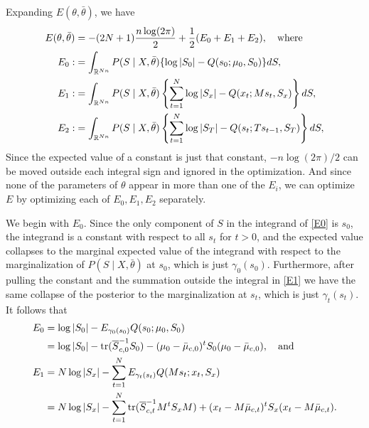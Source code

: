\documentclass[12pt,leqno]{article}
\begin{document}
Expanding $E(\theta,\bar{\theta})$, we have 
\begin{align}
  E(\theta,\bar{\theta}) &= -(2N+1)\frac{n\log(2\pi)}{2} + \frac{1}{2}(E_0 + E_1 + E_2),\quad\text{where}\notag\\
  E_0 :&=\int_{{\mathbb R}^{Nn}}P(S\mid X,\bar{\theta})\{\log|S_0| - Q(s_0;\mu_0,S_0)\}dS,\label{E0}\\
  E_1 :&= \int_{{\mathbb R}^{Nn}}P(S\mid X,\bar{\theta})\left\{\sum_{t=1}^N\log|S_x| - Q(x_t;Ms_t,S_x)\right\}dS,
\label{E1}\\
E_2 :&= \int_{{\mathbb R}^{Nn}}P(S\mid X,\bar{\theta})\left\{\sum_{t=1}^N\log|S_T| - Q(s_t;Ts_{t-1},S_T)\right\}dS,
\label{E2}
\end{align}
Since the expected value of a constant is just that constant, $-n\log(2\pi)/2$ can be moved outside each
integral sign and ignored in the optimization.  And since none of the parameters of $\theta$ appear in more
than one of the $E_i$, we can optimize $E$ by optimizing each of $E_0,E_1,E_2$ separately.

We begin with $E_0$. Since the only component of $S$ in the integrand of \eqref{E0} is $s_0$, the integrand is a constant
with respect to all $s_t$ for $t > 0$, and the expected value
collapses to the marginal 
expected value of the integrand with respect to the marginalization of $P(S\mid X,\bar{\theta})$ at $s_0$, which is just 
$\gamma_0(s_0)$.  Furthermore, after pulling the constant and the summation 
outside the integral in \eqref{E1} we have the same collapse of the posterior to the marginalization at $s_t$, which
is just $\gamma_t(s_t)$.  It follows that
\begin{align}
  \notag E_0 &= \log|S_0| - E_{\gamma_0(s_0)}Q(s_0;\mu_0,S_0)\\
  &= \log|S_0| - \text{\rm tr}(\overline{S}_{c,0}^{-1}S_0) - (\mu_0-\bar{\mu}_{c,0})^tS_0(\mu_0 - \bar{\mu}_{c,0}),
  \label{E0:1}\quad\text{and}\\
  \notag E_1 &= N\log|S_x| - \sum_{t=1}^NE_{\gamma_t(s_t)}Q(Ms_t;x_t,S_x)\\
  &= N\log|S_x| - \sum_{t=1}^N\text{\rm tr}(\overline{S}_{c,t}^{-1}M^tS_xM) + (x_t-M\bar{\mu}_{c,t})^tS_x(x_t-M\bar{\mu}_{c,t})\label{E1:1}.
\end{align}
\end{document}
